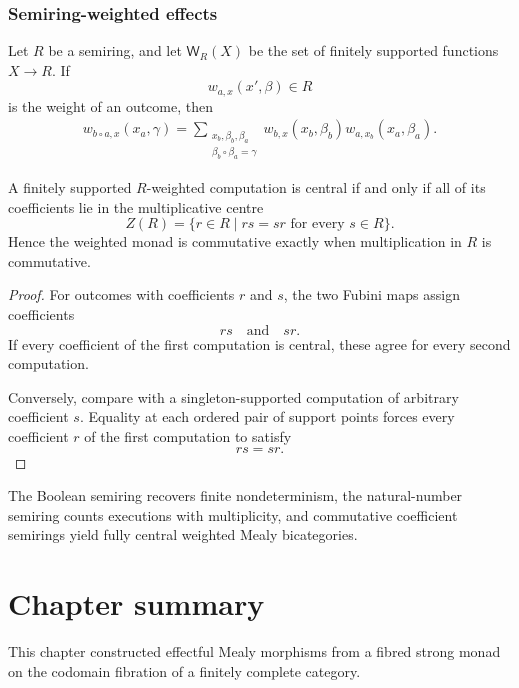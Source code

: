 \subsubsection{Semiring-weighted effects}

Let \(R\) be a semiring, and let \(\mathsf W_R(X)\) be the set of finitely
supported functions \(X\to R\).  If
\[
    w_{a,x}(x',\beta)\in R
\]
is the weight of an outcome, then
\[
\begin{aligned}
w_{b\circ a,x}(x_a,\gamma)
=
\sum_{\substack{
    x_b,\beta_b,\beta_a\\
    \beta_b\circ\beta_a=\gamma
}}
w_{b,x}(x_b,\beta_b)
w_{a,x_b}(x_a,\beta_a).
\end{aligned}
\]

\begin{proposition}
\label{prop:central-weighted-computations}
A finitely supported \(R\)-weighted computation is central if and only if all
of its coefficients lie in the multiplicative centre
\[
    Z(R)
    =
    \{r\in R\mid rs=sr\text{ for every }s\in R\}.
\]
Hence the weighted monad is commutative exactly when multiplication in
\(R\) is commutative.
\end{proposition}

\begin{proof}
For outcomes with coefficients \(r\) and \(s\), the two Fubini maps assign
coefficients
\[
    rs
    \quad\text{and}\quad
    sr.
\]
If every coefficient of the first computation is central, these agree for
every second computation.

Conversely, compare with a singleton-supported computation of arbitrary
coefficient \(s\).  Equality at each ordered pair of support points forces
every coefficient \(r\) of the first computation to satisfy
\[
    rs=sr.
\]
\end{proof}

The Boolean semiring recovers finite nondeterminism, the natural-number
semiring counts executions with multiplicity, and commutative coefficient
semirings yield fully central weighted Mealy bicategories.

\section{Chapter summary}
\label{sec:effectful-chapter-summary}

This chapter constructed effectful Mealy morphisms from a fibred strong monad
on the codomain fibration of a finitely complete category.

